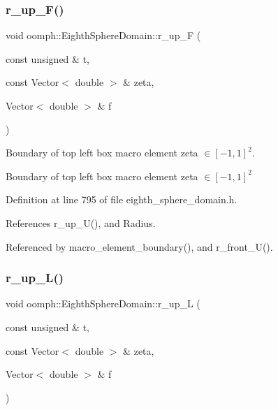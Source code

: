 \subsubsection{\texorpdfstring{r\+\_\+up\+\_\+\+F()}{r\_up\_F()}}
{\footnotesize\ttfamily void oomph\+::\+Eighth\+Sphere\+Domain\+::r\+\_\+up\+\_\+F (\begin{DoxyParamCaption}\item[{const unsigned \&}]{t,  }\item[{const Vector$<$ double $>$ \&}]{zeta,  }\item[{Vector$<$ double $>$ \&}]{f }\end{DoxyParamCaption})\hspace{0.3cm}{\ttfamily [private]}}



Boundary of top left box macro element zeta $ \in [-1,1]^2 $. 

Boundary of top left box macro element zeta $ \in [-1,1]^2 $ 

Definition at line 795 of file eighth\+\_\+sphere\+\_\+domain.\+h.



References r\+\_\+up\+\_\+\+U(), and Radius.



Referenced by macro\+\_\+element\+\_\+boundary(), and r\+\_\+front\+\_\+\+U().

\mbox{\label{classoomph_1_1EighthSphereDomain_af9ab515958ed3699ea5ed95ec9a87d9e}} 
\subsubsection{\texorpdfstring{r\+\_\+up\+\_\+\+L()}{r\_up\_L()}}
{\footnotesize\ttfamily void oomph\+::\+Eighth\+Sphere\+Domain\+::r\+\_\+up\+\_\+L (\begin{DoxyParamCaption}\item[{const unsigned \&}]{t,  }\item[{const Vector$<$ double $>$ \&}]{zeta,  }\item[{Vector$<$ double $>$ \&}]{f }\end{DoxyParamCaption})\hspace{0.3cm}{\ttfamily [private]}}




